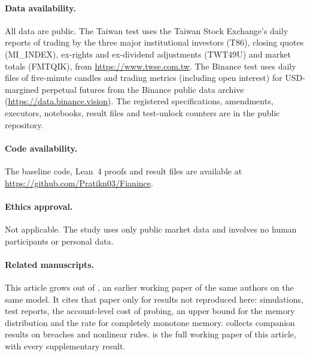 \documentclass[12pt]{article}
\theoremstyle{definition}
\theoremstyle{remark}
\begin{document}
\paragraph{Data availability.} All data are public. The Taiwan test uses the Taiwan Stock Exchange's daily reports of trading by the three major institutional investors (T86), closing quotes (MI\_INDEX), ex-rights and ex-dividend adjustments (TWT49U) and market totals (FMTQIK), from \url{https://www.twse.com.tw}. The Binance test uses daily files of five-minute candles and trading metrics (including open interest) for USD-margined perpetual futures from the Binance public data archive (\url{https://data.binance.vision}). The registered specifications, amendments, executors, notebooks, result files and test-unlock counters are in the public repository.

\paragraph{Code availability.} The baseline code, Lean~4 proofs and result files are available at \url{https://github.com/Pratikn03/Fianince}.

\paragraph{Ethics approval.} Not applicable. The study uses only public market data and involves no human participants or personal data.

\paragraph{Related manuscripts.} This article grows out of \citet{niroula2026a}, an earlier working paper of the same authors on the same model. It cites that paper only for results not reproduced here: simulations, test reports, the account-level cost of probing, an upper bound for the memory distribution and the rate for completely monotone memory. \citet{niroula2026c} collects companion results on breaches and nonlinear rules. \citet{niroula2026full} is the full working paper of this article, with every supplementary result.
\end{document}
